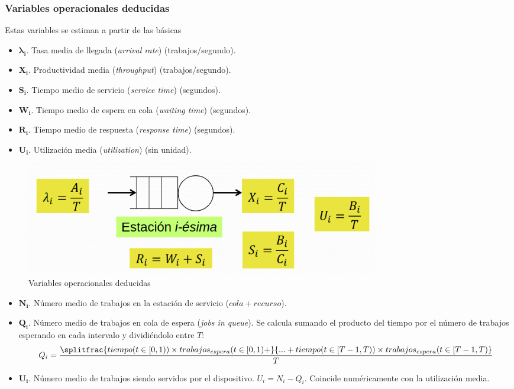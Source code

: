 \documentclass[12pt,spanish]{article}
\begin{document}
\subsubsection{Variables operacionales deducidas}

Estas variables se estiman a partir de las básicas
\begin{itemize}
	\item $\pmb{\lambda_i}$. Tasa media de llegada (\textit{arrival rate}) (trabajos/segundo).
	\item $\pmb{X_i}$. Productividad media (\textit{throughput}) (trabajos/segundo).
	\item $\pmb{S_i}$. Tiempo medio de servicio (\textit{service time}) (segundos).
	\item $\pmb{W_i}$. Tiempo medio de espera en cola (\textit{waiting time}) (segundos).
	\item $\pmb{R_i}$. Tiempo medio de respuesta (\textit{response time}) (segundos).
	\item $\pmb{U_i}$. Utilización media (\textit{utilization}) (sin unidad).
\end{itemize}

\begin{figure}[H]
	\centering
	\includegraphics[width=0.75\textwidth]{vardeduc.png}
	\caption{Variables operacionales deducidas}
\end{figure}

\begin{itemize}
	\item $\pmb{N_i}$. Número medio de trabajos en la estación de servicio ($cola + recurso$).
	\item $\pmb{Q_i}$. Número medio de trabajos en cola de espera (\textit{jobs in queue}). Se calcula sumando el producto del tiempo por el número de trabajos esperando en cada intervalo y dividiéndolo entre $T$:
	\begin{equation*}
			Q_i= \frac{\splitfrac{tiempo(t \in [0,1)) \times trabajos_{espera}(t \in [0,1) +}{ ... + tiempo(t \in [T-1,T)) \times trabajos_{espera}(t \in [T-1,T)}}{T}
	\end{equation*}

	\item $\pmb{U_i}$. Número medio de trabajos siendo servidos por el dispositivo. $U_i=N_i - Q_i$. Coincide numéricamente con la utilización media.
\end{itemize}
\end{document}
